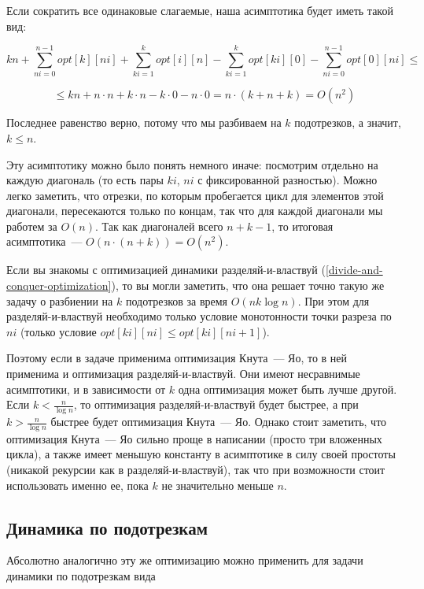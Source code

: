 Если сократить все одинаковые слагаемые, наша асимптотика будет иметь такой вид:

$$kn + \sum_{ni = 0}^{n - 1} opt[k][ni] + \sum_{ki = 1}^k opt[i][n] - \sum_{ki = 1}^{k} opt[ki][0] - \sum_{ni = 0}^{n - 1} opt[0][ni] \le $$

$$ \le kn + n \cdot n + k \cdot n - k \cdot 0 - n \cdot 0 = n \cdot (k + n + k) = O(n^2)$$

Последнее равенство верно, потому что мы разбиваем на $k$ подотрезков, а значит, $k \le n$.

Эту асимптотику можно было понять немного иначе: посмотрим отдельно на каждую диагональ (то есть пары $ki$, $ni$ с фиксированной разностью). Можно легко заметить, что отрезки, по которым пробегается цикл для элементов этой диагонали, пересекаются только по концам, так что для каждой диагонали мы работем за $O(n)$. Так как диагоналей всего $n + k - 1$, то итоговая асимптотика~--- $O(n \cdot (n + k)) = O(n^2)$.

\begin{observation}
    Если вы знакомы с оптимизацией динамики разделяй-и-властвуй (\ref{divide-and-conquer-optimization}), то вы могли заметить, что она решает точно такую же задачу о разбиении на $k$ подотрезков за время $O(n k \log n)$. При этом для разделяй-и-властвуй необходимо только условие монотонности точки разреза по $ni$ (только условие $opt[ki][ni] \le opt[ki][ni + 1]$).

    Поэтому если в задаче применима оптимизация Кнута~--- Яо, то в ней применима и оптимизация разделяй-и-властвуй. Они имеют несравнимые асимптотики, и в зависимости от $k$ одна оптимизация может быть лучше другой. Если $k < \frac{n}{\log n}$, то оптимизация разделяй-и-властвуй будет быстрее, а при $k > \frac{n}{\log n}$ быстрее будет оптимизация Кнута~--- Яо. Однако стоит заметить, что оптимизация Кнута~--- Яо сильно проще в написании (просто три вложенных цикла), а также имеет меньшую константу в асимптотике в силу своей простоты (никакой рекурсии как в разделяй-и-властвуй), так что при возможности стоит использовать именно ее, пока $k$ не значительно меньше $n$.
\end{observation}

\subsection{Динамика по подотрезкам}

Абсолютно аналогично эту же оптимизацию можно применить для задачи динамики по подотрезкам вида

